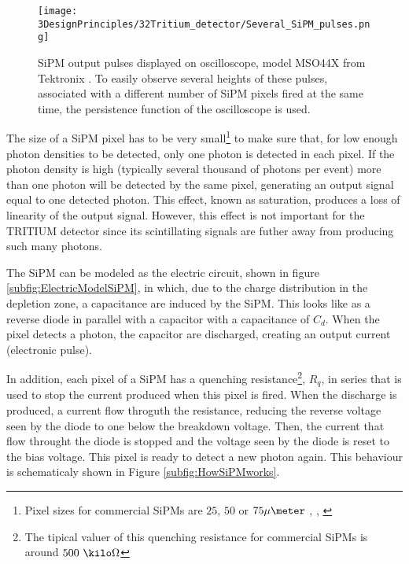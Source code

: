 \begin{figure}[h]
\centering
\texttt{[image: 3DesignPrinciples/32Tritium\_detector/Several\_SiPM\_pulses.png]}
\caption{SiPM output pulses displayed on oscilloscope, model MSO44X from Tektronix \cite{Oscilloscope}. To easily observe several heights of these pulses, associated with a different number of  SiPM pixels fired at the same time, the persistence function of the oscilloscope is used.\label{fig:PulsesOfSiPM}}
\end{figure}

The size of a SiPM pixel has to be very small\footnote{Pixel sizes for commercial SiPMs are $25$, $50$ or $75\mu\meter$ \cite{DataSheetHammamatsu_1_SiPM_25}, \cite{DataSheetHammamatsu_1_SiPM_50}, \cite{DataSheetHammamatsu_1_SiPM_75}} to make sure that, for low enough photon densities to be detected, only one photon is detected in each pixel. If the photon density is high (typically several thousand of photons per event) more than one photon will be detected by the same pixel, generating an output signal equal to one detected photon. This effect, known as saturation, produces a loss of linearity of the output signal. However, this effect is not important for the TRITIUM detector since its scintillating signals are futher away from producing such many photons. %

The SiPM can be modeled as the electric circuit, shown in figure \ref{subfig:ElectricModelSiPM}, in which, due to the charge distribution in the depletion zone, a capacitance are induced by the SiPM. This looks like as a reverse diode in parallel with a capacitor with a capacitance of $C_d$. When the pixel detects a photon, the capacitor are discharged, creating an output current (electronic pulse).

In addition, each pixel of a SiPM has a quenching resistance\footnote{The tipical valuer of this quenching resistance for commercial SiPMs is around $500~\kilo\Omega$}, $R_q$, in series that is used to stop the current produced when this pixel is fired. When the discharge is produced, a current flow throguth the resistance, reducing the reverse voltage seen by the diode to one below the breakdown voltage. Then, the current that flow throught the diode is stopped and the voltage seen by the diode is reset to the bias voltage. This pixel is ready to detect a new photon again. This behaviour is schematicaly shown in Figure \ref{subfig:HowSiPMworks}.

